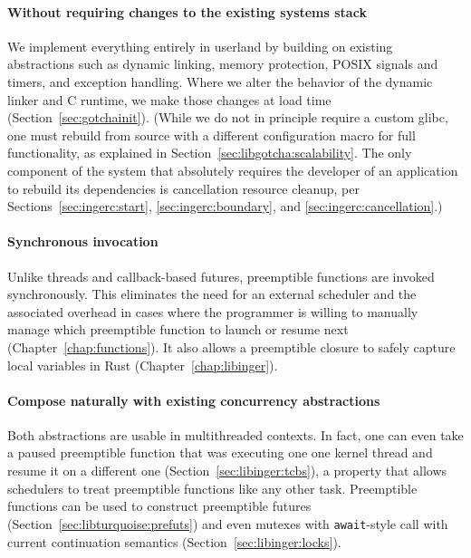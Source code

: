 \paragraph{Without requiring changes to the existing systems stack}
We implement everything entirely in userland by building on existing abstractions
such as dynamic linking, memory protection, POSIX signals and timers, and exception
handling.  Where we alter the behavior of the dynamic linker and C runtime, we make
those changes at load time (Section~\ref{sec:gotchainit}).  (While we do not in
principle require a custom glibc, one must rebuild from source with a different
configuration macro for full functionality, as explained in
Section~\ref{sec:libgotcha:scalability}.  The only component of the system that
absolutely requires the developer of an application to rebuild its dependencies is
cancellation resource cleanup, per Sections~\ref{sec:ingerc:start},
\ref{sec:ingerc:boundary}, and \ref{sec:ingerc:cancellation}.)

\paragraph{Synchronous invocation}
Unlike threads and callback-based futures, preemptible functions are invoked
synchronously.  This eliminates the need for an external scheduler and the associated
overhead in cases where the programmer is willing to manually manage which
preemptible function to launch or resume next (Chapter~\ref{chap:functions}).  It
also allows a preemptible closure to safely capture local variables in Rust
(Chapter~\ref{chap:libinger}).

\paragraph{Compose naturally with existing concurrency abstractions}
Both abstractions are usable in multithreaded contexts.  In fact, one can even take a
paused preemptible function that was executing one one kernel thread and resume it
on a different one (Section~\ref{sec:libinger:tcbs}), a property that allows
schedulers to treat preemptible functions like any other task.  Preemptible functions
can be used to construct preemptible futures (Section~\ref{sec:libturquoise:prefuts})
and even mutexes with \texttt{await}-style call with current continuation semantics
(Section~\ref{sec:libinger:locks}).


